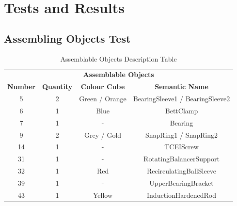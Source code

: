 
\chapter{Tests and Results} \label{cha:test}

\section{Assembling Objects Test}\label{sec:ass_objs_test}

\begin{table}[htbp]
  \centering
  \caption{Assemblable Objects Description Table}\label{Approcci}
  \medskip
\renewcommand\arraystretch{1.5}
\renewcommand\tabcolsep{12pt}
\begin{tabular}{cccc}
\toprule
\multicolumn{4}{c}{\textbf{Assemblable Objects}} \\
\textbf{Number} &  \textbf{Quantity} &  \textbf{Colour Cube} &  \textbf{Semantic Name}  \\
\midrule
\rowcolor{gray!35}
5 & 2 & Green / Orange & BearingSleeve1 / BearingSleeve2 \\
6 & 1 & Blue & BettClamp \\
\rowcolor{gray!35}
7 & 1 & - & Bearing \\
9 & 2 & Grey / Gold & SnapRing1 / SnapRing2 \\
\rowcolor{gray!35}
14 & 1 & - & TCEIScrew \\
31 & 1 & - & RotatingBalancerSupport \\
\rowcolor{gray!35}
32 & 1 & Red & RecirculatingBallSleeve \\
39 & 1 & - & UpperBearingBracket \\
\rowcolor{gray!35}
43 & 1 & Yellow & InductionHardenedRod \\
\bottomrule
\end{tabular}
\renewcommand\arraystretch{1}
\renewcommand\tabcolsep{1}
\end{table}


